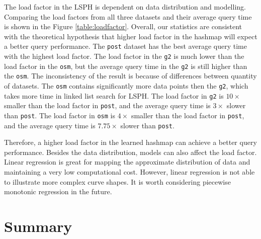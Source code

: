 The load factor in the LSPH is dependent on data distribution and modelling. Comparing the load factors from all three datasets and their average query time is shown in the Figure \ref{table:loadfactor}. Overall, our statistics are consistent with the theoretical hypothesis that higher load factor in the hashmap will expect a better query performance. The \texttt{post} dataset has the best average query time with the highest load factor. The load factor in the \texttt{g2} is much lower than the load factor in the \texttt{osm}, but the average query time in the \texttt{g2} is still higher than the \texttt{osm}. The inconsistency of the result is because of differences between quantity of datasets. The \texttt{osm} contains significantly more data points then the \texttt{g2}, which takes more time in linked list search for LSPH. The load factor in \texttt{g2} is $10\times$ smaller than the load factor in \texttt{post}, and the average query time is $3\times$ slower than \texttt{post}. The load factor in \texttt{osm} is $4\times$ smaller than the load factor in \texttt{post}, and the average query time is $7.75\times$ slower than \texttt{post}.

Therefore, a higher load factor in the learned hashmap can achieve a better query performance. Besides the data distribution, models can also affect the load factor. Linear regression is great for mapping the approximate distribution of data and maintaining a very low computational cost. However, linear regression is not able to illustrate more complex curve shapes. It is worth considering piecewise monotonic regression in the future. 


\section{Summary}


